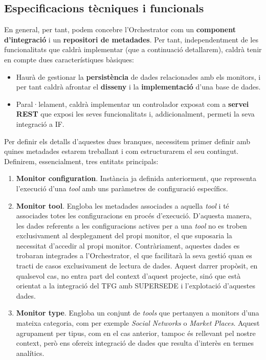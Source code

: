\subsection{Especificacions tècniques i funcionals}

En general, per tant, podem concebre l'Orchestrator com un \textbf{component d'integració} i un \textbf{repositori de metadades}. Per tant, independentment de les funcionalitats que caldrà implementar (que a continuació detallarem), caldrà tenir en compte dues característiques bàsiques:

\begin{itemize}
\item Haurà de gestionar la \textbf{persistència} de dades relacionades amb els monitors, i per tant caldrà afrontar el \textbf{disseny} i la \textbf{implementació} d'una base de dades.
\item Paral·lelament, caldrà implementar un controlador exposat com a \textbf{servei REST} que exposi les seves funcionalitats i, addicionalment, permeti la seva integració a IF.
\end{itemize}

Per definir els detalls d'aquestes dues branques, necessitem primer definir amb quines metadades estarem treballant i com estructurarem el seu contingut. Definirem, essencialment, tres entitats principals:

\begin{enumerate}
\item \textbf{Monitor configuration}. Instància ja definida anteriorment, que representa l'execució d'una \textit{tool} amb uns paràmetres de configuració específics.
\item \textbf{Monitor tool}. Engloba les metadades associades a aquella \textit{tool} i té associades totes les configuracions en procés d'execució. D'aquesta manera, les dades referents a les configuracions actives per a una \textit{tool} no es troben exclusivament al desplegament del propi monitor, el que suposaria la necessitat d'accedir al propi monitor. Contràriament, aquestes dades es trobaran integrades a l'Orchestrator, el que facilitarà la seva gestió quan es tracti de casos exclusivament de lectura de dades. Aquest darrer propòsit, en qualsevol cas, no entra part del context d'aquest projecte, sinó que està orientat a la integració del TFG amb SUPERSEDE i l'explotació d'aquestes dades.
\item \textbf{Monitor type}. Engloba un conjunt de \textit{tools} que pertanyen a monitors d'una mateixa categoria, com per exemple \textit{Social Networks} o \textit{Market Places}. Aquest agrupament per tipus, com en el cas anterior, tampoc és rellevant pel nostre context, però ens ofereix integració de dades que resulta d'interès en termes analítics.
\end{enumerate}

